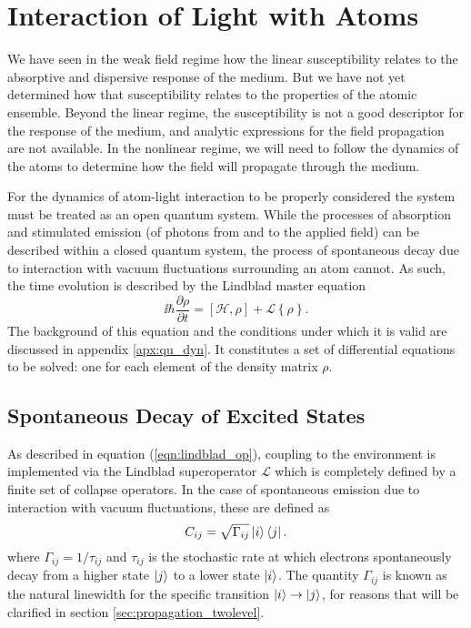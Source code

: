\section{Interaction of Light with Atoms}
  \label{sec:propagation_ali}

  We have seen in the weak field regime how the linear susceptibility relates to
  the absorptive and dispersive response of the medium. But we have not yet
  determined how that susceptibility relates to the properties of the atomic
  ensemble. Beyond the linear regime, the susceptibility is not a good
  descriptor for the response of the medium, and analytic expressions for the
  field propagation are not available. In the nonlinear regime, we will need to
  follow the dynamics of the atoms to determine how the field will propagate
  through the medium.

  For the dynamics of atom-light interaction to be properly considered the
  system must be treated as an open quantum system. While the processes of
  absorption and stimulated emission (of photons from and to the applied field)
  can be described within a closed quantum system, the process of spontaneous
  decay due to interaction with vacuum fluctuations surrounding an atom cannot.
  As such, the time evolution is described by the Lindblad master equation
    \begin{equation}\label{eqn:lindblad}
      \ii \hbar \frac{\partial \rho}{\partial t} = [\mathcal{H}, \rho] + 
        \mathcal{L}\left\{ \rho \right\}.
    \end{equation}
  The background of this equation and the conditions under which it is valid are
  discussed in appendix \ref{apx:qu_dyn}. It constitutes a set of differential
  equations to be solved: one for each element of the density matrix $\rho$.

  \subsection{Spontaneous Decay of Excited States}

    As described in equation (\ref{eqn:lindblad_op}), coupling to the
    environment is implemented via the Lindblad superoperator $\mathcal{L}$
    which is completely defined by a finite set of collapse operators. In the
    case of spontaneous emission due to interaction with vacuum fluctuations,
    these are defined as
    \begin{equation}
      C_{ij} = \sqrt{\Gamma_{ij}} \Ket{i} \Bra{j}.
    \end{equation}
    where $\Gamma_{ij} = 1/\tau_{ij}$ and $\tau_{ij}$ is the stochastic rate at
    which electrons spontaneously decay from a higher state $\Ket{j}$ to a lower
    state $\Ket{i}$. The quantity $\Gamma_{ij}$ is known as the natural
    linewidth for the specific transition $\Ket{i} \rightarrow \Ket{j}$, for
    reasons that will be clarified in section \ref{sec:propagation_twolevel}.

